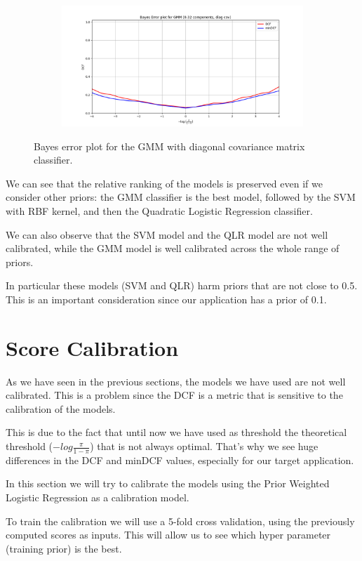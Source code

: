 \documentclass[12pt]{report}
\newcommand{\nnl}{%
    \newline
    \newline
}
\newcommand{\nl}{%
    \newline
    \noindent
}
\begin{document}
\begin{figure}[H]
    \centering
    \begin{subfigure}[t]{0.6\textwidth}
        \includegraphics[width=\textwidth]{./plot/model_selection/GMM.png}
    \end{subfigure}
    \caption{Bayes error plot for the GMM with diagonal covariance matrix classifier.}
    \label{fig:bayes_error_GMM}
\end{figure}
\noindent
We can see that the relative ranking of the models is preserved even if we consider other priors: the GMM classifier is the best model, followed by the SVM with RBF kernel, and then the Quadratic Logistic Regression classifier.
\nnl
We can also observe that the SVM model and the QLR model are not well calibrated, while the GMM model is well calibrated across the whole range of priors.
\nl
In particular these models (SVM and QLR) harm priors that are not close to 0.5. This is an important consideration since our application has a prior of 0.1.

\section{Score Calibration}
As we have seen in the previous sections, the models we have used are not well calibrated. This is a problem since the DCF is a metric that is sensitive to the calibration of the models.
\nl
This is due to the fact that until now we have used as threshold the theoretical threshold ($-{log}\frac{\pi}{1-\pi}$) that is not always optimal. That's why we see huge differences in the DCF and minDCF values, especially for our target application.
\nnl
In this section we will try to calibrate the models using the Prior Weighted Logistic Regression as a calibration model.
\nl
To train the calibration we will use a 5-fold cross validation, using the previously computed scores as inputs. This will allow us to see which hyper parameter (training prior) is the best.
\end{document}
